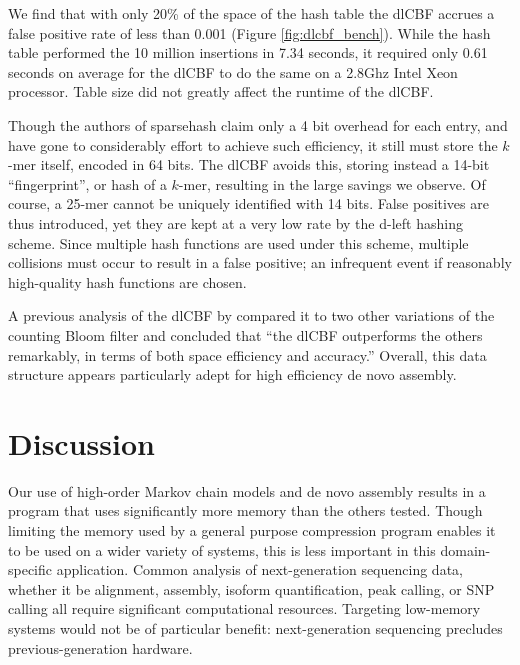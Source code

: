 \documentclass[twocolumn]{article}
\begin{document}
We find that with only 20\% of the space of the hash table the dlCBF accrues a
false positive rate of less than 0.001 (Figure \ref{fig:dlcbf_bench}). While
the hash table performed the 10 million insertions in 7.34 seconds, it
required only 0.61 seconds on average for the dlCBF to do the same on a 2.8Ghz
Intel Xeon processor. Table size did not greatly affect the runtime of the
dlCBF.

Though the authors of sparsehash claim only a 4 bit overhead for each entry,
and have gone to considerably effort to achieve such efficiency, it still must
store the $k$-mer itself, encoded in 64 bits. The dlCBF avoids this, storing
instead a 14-bit ``fingerprint'', or hash of a $k$-mer, resulting in the large
savings we observe. Of course, a 25-mer cannot be uniquely identified with 14
bits. False positives are thus introduced, yet they are kept at a very low
rate by the d-left hashing scheme. Since multiple hash functions are used
under this scheme, multiple collisions must occur to result in a false
positive; an infrequent event if reasonably high-quality hash functions are
chosen.

A previous analysis of the dlCBF by \citet{Zhang2009} compared it to two other
variations of the counting Bloom filter and concluded that ``the dlCBF
outperforms the others remarkably, in terms of both space efficiency and
accuracy.'' Overall, this data structure appears particularly adept for high
efficiency de novo assembly.

\section{Discussion}

Our use of high-order Markov chain models and de novo assembly results in a
program that uses significantly more memory than the others tested. Though
limiting the memory used by a general purpose compression program enables it
to be used on a wider variety of systems, this is less important in this
domain-specific application. Common analysis of next-generation sequencing
data, whether it be alignment, assembly, isoform quantification, peak calling,
or SNP calling all require significant computational resources. Targeting
low-memory systems would not be of particular benefit: next-generation
sequencing precludes previous-generation hardware.




\end{document}
